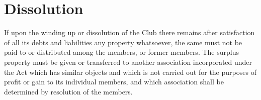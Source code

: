 \documentclass[12pt]{article} %
\begin{document}
\section{Dissolution}
If upon the winding up or dissolution of the Club there remains after satisfaction of all its
debts and liabilities any property whatsoever, the same must not be paid to or distributed
among the members, or former members. The surplus property must be given or transferred to
another association incorporated under the Act which has similar objects and which is not
carried out for the purposes of profit or gain to its individual members, and which association
shall be determined by resolution of the members.
\end{document}
